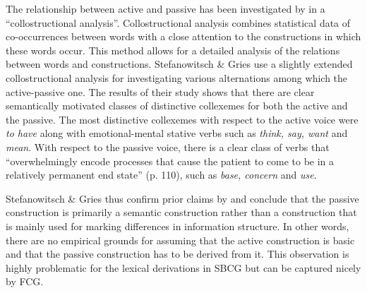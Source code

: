 The relationship between active and passive has been investigated by \citet{stefanowitsch03collostructions} in a ``collostructional analysis''. Collostructional analysis combines statistical data of co-occurrences between words with a close attention to the constructions in which these words occur. This method allows for a detailed analysis of the relations between words and constructions. Stefanowitsch \& Gries use a slightly extended collostructional analysis for investigating various alternations among which the active-passive one. The results of their study shows that there are clear semantically motivated classes of distinctive collexemes for both the active and the passive. The most distinctive collexemes with respect to the active voice were {\em to have} along with emotional-mental stative verbs such as {\em think, say, want} and {\em mean}. With respect to the passive voice, there is a clear class of verbs that 
``overwhelmingly encode processes that cause the patient to come to be in a relatively permanent end state'' (p. 110),
 such as {\em base, concern} and {\em use}.

Stefanowitsch \& Gries thus confirm prior claims by \citet{pinker89learnability} and conclude that the passive construction is primarily a semantic construction rather than a construction that is mainly used for marking differences in information structure. In other words, there are no empirical grounds for assuming that the active construction is basic and that the passive construction has to be derived from it. This observation is highly problematic for the lexical derivations in SBCG but can be captured nicely by FCG.
 
